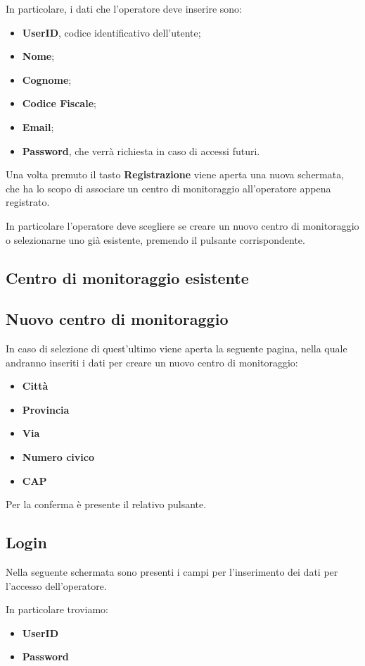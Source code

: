 In particolare, i dati che l'operatore deve inserire sono:
\begin{itemize}
	\item  \textbf{UserID}, codice identificativo dell'utente;
	\item  \textbf{Nome};
	\item  \textbf{Cognome};
	\item  \textbf{Codice Fiscale};
	\item  \textbf{Email};
	\item  \textbf{Password}, che verrà richiesta in caso di accessi futuri.
\end{itemize}
Una volta premuto il tasto \textbf{Registrazione} viene aperta una nuova schermata, che ha lo scopo di associare un centro di monitoraggio all'operatore appena registrato.

In particolare l'operatore deve scegliere se creare un nuovo centro di monitoraggio o selezionarne uno già esistente, premendo il pulsante corrispondente.
\subsection{Centro di monitoraggio esistente}
\subsection{Nuovo centro di monitoraggio} \label{NuovoCentroDiMonitoraggio}
In caso di selezione di quest'ultimo viene aperta la seguente pagina, nella quale andranno inseriti i dati per creare un nuovo centro di monitoraggio:
\begin{itemize}
	\item \textbf{Città}
	\item \textbf{Provincia}
	\item \textbf{Via}
	\item \textbf{Numero civico}
	\item \textbf{CAP}
\end{itemize}
Per la conferma è presente il relativo pulsante.
\subsection{Login}
Nella seguente schermata sono presenti i campi per l'inserimento dei dati per l'accesso dell'operatore.

In particolare troviamo:
\begin{itemize}
	\item \textbf{UserID} 
	\item \textbf{Password}
\end{itemize} 

